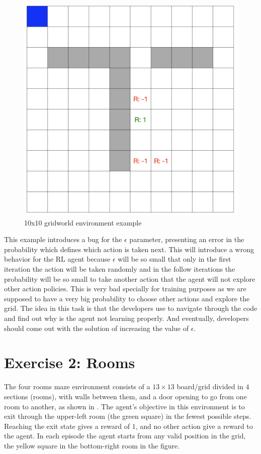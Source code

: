 \begin{figure}[h]
  \centering
  \includegraphics[width=0.5\columnwidth]{figures/gridworld.png}
  \caption{10x10 gridworld environment example}
  \label{fig:gridworld}
\end{figure}

This example introduces a bug for the $\epsilon$ parameter, presenting an error in the probability which
defines which action is taken next. This will introduce a wrong behavior for the \ac{RL} 
agent because $\epsilon$ will be so small that only in the first iteration the action will be taken randomly 
and in the follow iterations the probability will be so small to take another action that the agent will not explore
other action policies. This is very bad specially for training purposes as we are supposed to have a very big 
probability to choose other actions and explore the grid. The idea in this task is that the developers
use \flik to navigate through the code and find out why is the agent not learning properly. And eventually,
developers should come out with the solution of increasing the value of $\epsilon$. 

\section{Exercise 2: Rooms}
\label{sec:rooms-eval}

The four rooms maze environment consists of a $13\times 13$ board/grid divided in $4$ sections 
(\ie rooms), with walls between them, and a door opening to go from one room to another, as shown 
in . The agent's objective in this environment is to exit through the upper-left room 
(the green square) in the fewest possible steps. Reaching the exit state gives a reward of $1$, and no 
other action give a reward to the agent. In each episode the agent starts from any valid position in the 
grid, \eg the yellow square in the bottom-right room in the figure. 

